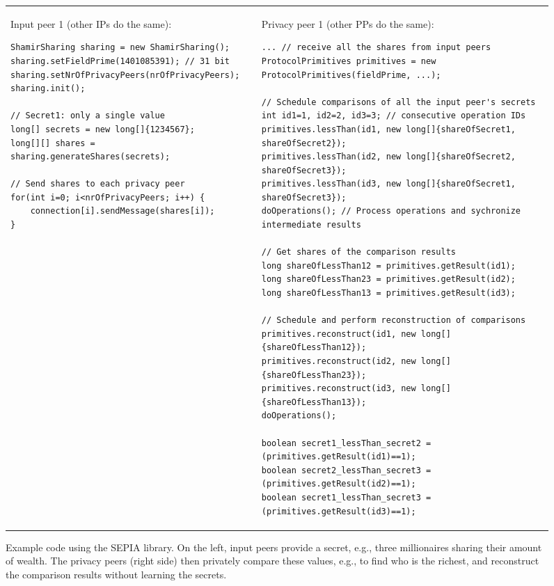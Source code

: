 \documentclass[letterpaper,11pt,onecolumn,titlepage]{article}
\begin{document}
\begin{figure}
\begin{tabular}{ll}
	\begin{minipage}[t]{0.39\textwidth}
	Input peer 1 (other IPs do the same):
	\begin{lstlisting}
ShamirSharing sharing = new ShamirSharing();
sharing.setFieldPrime(1401085391); // 31 bit
sharing.setNrOfPrivacyPeers(nrOfPrivacyPeers); 
sharing.init();

// Secret1: only a single value
long[] secrets = new long[]{1234567}; 
long[][] shares = sharing.generateShares(secrets);

// Send shares to each privacy peer
for(int i=0; i<nrOfPrivacyPeers; i++) {
	connection[i].sendMessage(shares[i]);
}
	\end{lstlisting}
	\end{minipage}
&	
	\begin{minipage}[t]{0.57\textwidth}
	Privacy peer 1 (other PPs do the same):
	\begin{lstlisting}
... // receive all the shares from input peers
ProtocolPrimitives primitives = new ProtocolPrimitives(fieldPrime, ...);

// Schedule comparisons of all the input peer's secrets
int id1=1, id2=2, id3=3; // consecutive operation IDs
primitives.lessThan(id1, new long[]{shareOfSecret1, shareOfSecret2});
primitives.lessThan(id2, new long[]{shareOfSecret2, shareOfSecret3});
primitives.lessThan(id3, new long[]{shareOfSecret1, shareOfSecret3});
doOperations(); // Process operations and sychronize intermediate results

// Get shares of the comparison results
long shareOfLessThan12 = primitives.getResult(id1);
long shareOfLessThan23 = primitives.getResult(id2);
long shareOfLessThan13 = primitives.getResult(id3);
  
// Schedule and perform reconstruction of comparisons
primitives.reconstruct(id1, new long[]{shareOfLessThan12});
primitives.reconstruct(id2, new long[]{shareOfLessThan23});
primitives.reconstruct(id3, new long[]{shareOfLessThan13});
doOperations();

boolean secret1_lessThan_secret2 = (primitives.getResult(id1)==1);
boolean secret2_lessThan_secret3 = (primitives.getResult(id2)==1);
boolean secret1_lessThan_secret3 = (primitives.getResult(id3)==1);
	\end{lstlisting}
	\end{minipage}
\end{tabular} 
\caption{Example code using the SEPIA library. On the left, input peers provide a secret, e.g., three millionaires sharing their amount of wealth. The privacy peers (right side) then privately compare these values, e.g., to find who is the richest, and reconstruct the comparison results without learning the secrets.}\label{fig:code}\end{figure}
\end{document}

